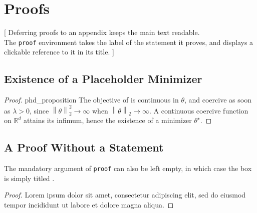 \chapter[phd_proofs]{Proofs}
 [
  Deferring proofs to an appendix keeps the main text readable. \\
  The \texttt{proof} environment takes the label of the statement it proves, and displays a clickable reference to it in its title.
 ]

\section[phd_proofs_proposition]{Existence of a Placeholder Minimizer}

\begin{proof}{phd_proposition}
    The objective of  is continuous in $\theta$, and coercive as soon as $\lambda > 0$, since $\left\| \theta \right\|_2^2 \to \infty$ when $\left\| \theta \right\|_2 \to \infty$.
    A continuous coercive function on $\mathbb{R}^d$ attains its infimum, hence the existence of a minimizer $\theta^\star$.
\end{proof}

\section[phd_proofs_misc]{A Proof Without a Statement}

The mandatory argument of \texttt{proof} can also be left empty, in which case the box is simply titled .

\begin{proof}{}
    Lorem ipsum dolor sit amet, consectetur adipiscing elit, sed do eiusmod tempor incididunt ut labore et dolore magna aliqua.
\end{proof}
